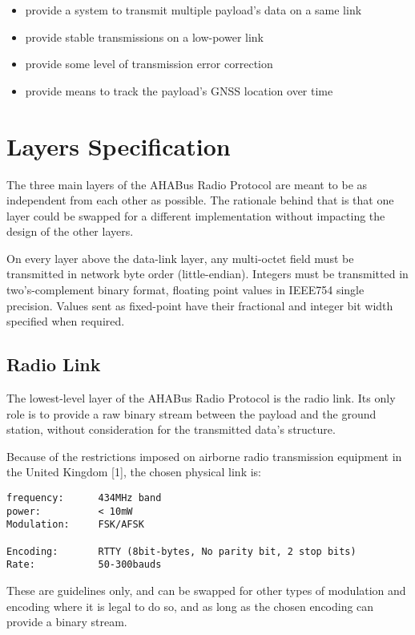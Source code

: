 \begin{appendices}
\begin{itemize}
\item
  provide a system to transmit multiple payload's data on a same link
\item
  provide stable transmissions on a low-power link
\item
  provide some level of transmission error correction
\item
  provide means to track the payload's GNSS location over time
\end{itemize}

\section{Layers Specification}\label{layers-specification}

The three main layers of the AHABus Radio Protocol are meant to be as
independent from each other as possible. The rationale behind that is
that one layer could be swapped for a different implementation without
impacting the design of the other layers.

On every layer above the data-link layer, any multi-octet field must be
transmitted in network byte order (little-endian). Integers must be
transmitted in two's-complement binary format, floating point values in
IEEE754 single precision. Values sent as fixed-point have their
fractional and integer bit width specified when required.

\subsection{Radio Link}\label{radio-link}

The lowest-level layer of the AHABus Radio Protocol is the radio link.
Its only role is to provide a raw binary stream between the payload and
the ground station, without consideration for the transmitted data's
structure.

Because of the restrictions imposed on airborne radio transmission
equipment in the United Kingdom {[}1{]}, the chosen physical link is:

\begin{verbatim}
frequency:      434MHz band
power:          < 10mW
Modulation:     FSK/AFSK
 
Encoding:       RTTY (8bit-bytes, No parity bit, 2 stop bits)
Rate:           50-300bauds
\end{verbatim}

These are guidelines only, and can be swapped for other types of
modulation and encoding where it is legal to do so, and as long as the
chosen encoding can provide a binary stream.


\end{appendices}
